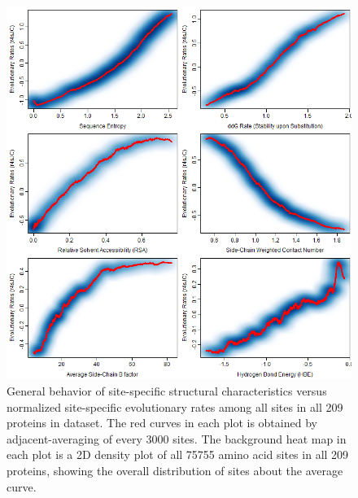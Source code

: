 \documentclass[11pt]{article}
\begin{document}
    \begin{figure}
        \begin{center}
        \includegraphics[width=5.5in]{adjacent_averaging_screen/only_nonvoro/zr4s_JC_nonvoro.png}
        \end{center}
        \caption{General behavior of site-specific structural characteristics versus normalized site-specific evolutionary rates among all sites in all 209 proteins in dataset. The red curves in each plot is obtained by adjacent-averaging of every $3000$ sites. The background heat map in each plot is a 2D density plot of all 75755 amino acid sites in all 209 proteins, showing the overall distribution of sites about the average curve.}
        \label{fig:zr4s_JC_nonvoro}
    \end{figure}

\end{document}
